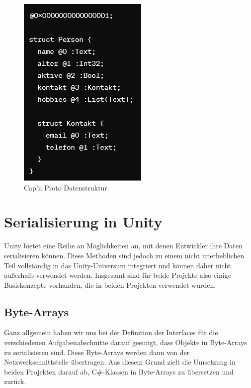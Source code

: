 \begin{figure}[]
\begin{minipage}{0.48\textwidth}
		\includegraphics[width=\textwidth]{figures/capnprotoexample.png}
		\caption{Cap'n Proto Datenstruktur}
		\label{fig:capnproto}
	\end{minipage}\hfill
	
\end{figure}


\section{Serialisierung in Unity}

Unity bietet eine Reihe an Möglichkeiten an, mit denen Entwickler ihre Daten serialisieren können. Diese Methoden sind jedoch zu einem nicht unerheblichen Teil vollständig in das Unity-Universum integriert und können daher nicht außerhalb verwendet werden. Insgesamt sind für beide Projekte also einige Basiskonzepte vorhanden, die in beiden Projekten verwendet wurden.

\subsection{Byte-Arrays}

Ganz allgemein haben wir uns bei der Definition der Interfaces für die verschiedenen Aufgabenabschnitte darauf geeinigt, dass Objekte in Byte-Arrays zu serialisieren sind. Diese Byte-Arrays werden dann von der Netzwerkschnittstelle übertragen. Aus diesem Grund zielt die Umsetzung in beiden Projekten darauf ab, C\#-Klassen in Byte-Arrays zu übersetzen und zurück.
